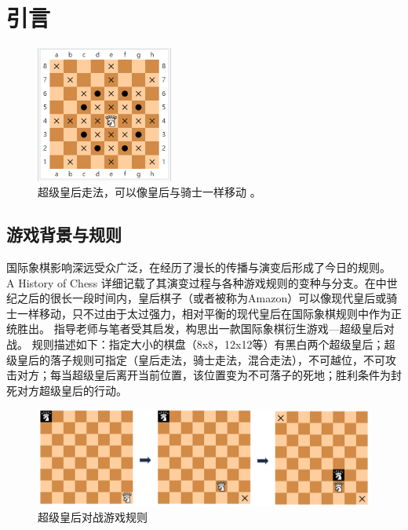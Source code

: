 \chapter{引言}
\label{chap:introduction}

\begin{figure}[htb]
    \centering
    \includegraphics[width=0.4\textwidth]{amazon.PNG}
    \caption[超级皇后]{%
      超级皇后走法，可以像皇后与骑士一样移动%
      \cite{wikiAmazon}。}
    \label{fig:superQueen}
  \end{figure}

\section{游戏背景与规则}
国际象棋影响深远受众广泛，在经历了漫长的传播与演变后形成了今日的规则。
A History of Chess 详细记载了其演变过程与各种游戏规则的变种与分支\cite{murray2015history}。在中世纪之后的很长一段时间内，皇后棋子（或者被称为Amazon）可以像现代皇后或骑士一样移动，只不过由于太过强力，相对平衡的现代皇后在国际象棋规则中作为正统胜出。
指导老师与笔者受其启发，构思出一款国际象棋衍生游戏—超级皇后对战。
规则描述如下：指定大小的棋盘（8x8，12x12等）有黑白两个超级皇后；超级皇后的落子规则可指定（皇后走法，骑士走法，混合走法），不可越位，不可攻击对方；每当超级皇后离开当前位置，该位置变为不可落子的死地；胜利条件为封死对方超级皇后的行动。

\begin{figure}[htb]
    \centering
    \includegraphics[width=1\textwidth]{rules.PNG}
    \caption[游戏规则]{%
      超级皇后对战游戏规则%
      }
    \label{fig:superQueenRules}
  \end{figure}


